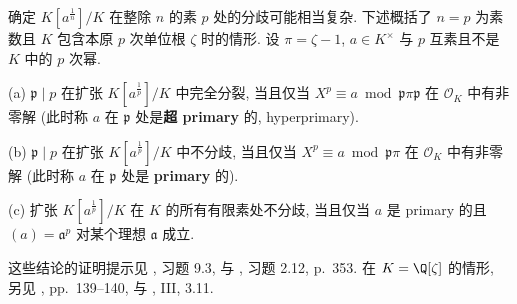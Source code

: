 \begin{remark}\label{rem:vii.A.6}
确定 $K[a^{\frac{1}{n}}]/K$ 在整除 $n$ 的素 $p$ 处的分歧可能相当复杂. 下述概括了 $n=p$ 为素数且 $K$ 包含本原 $p$ 次单位根 $\zeta$ 时的情形. 设 $\pi=\zeta-1$, $a\in K^{\times}$ 与 $p$ 互素且不是 $K$ 中的 $p$ 次幂.

(a) $\mathfrak{p}\mid p$ 在扩张 $K[a^{\frac{1}{p}}]/K$ 中完全分裂, 当且仅当 $X^{p}\equiv a\bmod\mathfrak{p}\pi\mathfrak{p}$ 在 $\mathcal{O}_K$ 中有非零解 (此时称 $a$ 在 $\mathfrak{p}$ 处是\textbf{超 primary} 的, hyperprimary).

(b) $\mathfrak{p}\mid p$ 在扩张 $K[a^{\frac{1}{p}}]/K$ 中不分歧, 当且仅当 $X^{p}\equiv a\bmod\mathfrak{p}\pi$ 在 $\mathcal{O}_K$ 中有非零解 (此时称 $a$ 在 $\mathfrak{p}$ 处是 \textbf{primary} 的).

(c) 扩张 $K[a^{\frac{1}{p}}]/K$ 在 $K$ 的所有有限素处不分歧, 当且仅当 $a$ 是 primary 的且 $(a)=\mathfrak{a}^{p}$ 对某个理想 $\mathfrak{a}$ 成立.

这些结论的证明提示见 \cite{Washington1997}, 习题 9.3, 与 \cite{CasselsFrohlich1967}, 习题 2.12, p.~353. 在 $K=\Q[\zeta]$ 的情形, 另见 \cite{Cassels1986}, pp.~139--140, 与 \cite{FrohlichTaylor1991}, III, 3.11.
\end{remark}

\renewcommand{\thetheorem}{\thesection.\arabic{theorem}}
